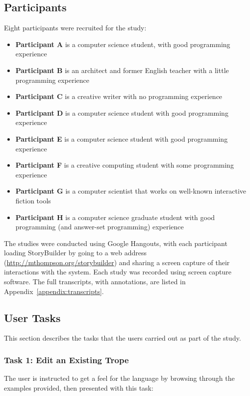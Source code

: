 \documentclass[11pt]{report}
\begin{document}
\subsection{Participants}
Eight participants were recruited for the study:

\begin{itemize}
\item \textbf{Participant A} is a computer science student,
with good programming experience
\item \textbf{Participant B} is an architect and former English teacher with a little programming experience
\item \textbf{Participant C} is a creative writer with no programming experience
\item \textbf{Participant D} is a computer science student with good programming experience
\item \textbf{Participant E} is a computer science student with good programming experience
\item \textbf{Participant F} is a creative computing student with some programming experience
\item \textbf{Participant G} is a computer scientist that works on well-known
interactive fiction tools
\item \textbf{Participant H} is a computer science graduate student with good
programming (and answer-set programming) experience
\end{itemize}

The studies were conducted using Google Hangouts, with each participant loading
StoryBuilder by going to a web address
(\url{http://mthompson.org/storybuilder}) and sharing a screen capture of their
interactions with the system. Each study was recorded using screen capture
software. The full transcripts, with annotations, are listed in
Appendix~\ref{appendix:transcripts}.

\subsection{User Tasks}
\label{sec:user-tasks}
This section describes the tasks that the users carried out as part of the study.

\subsubsection*{Task 1: Edit an Existing Trope}
\label{sec:org14aee76}
The user is instructed to get a feel for the language by browsing through
the examples provided, then presented with this task:
\end{document}
